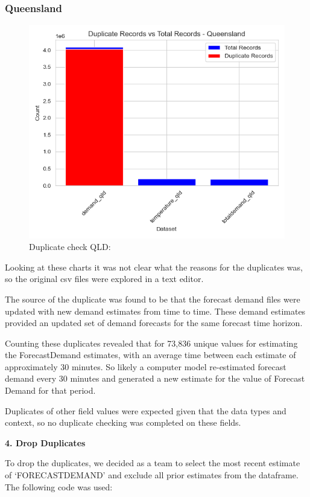 \documentclass[mstat,12pt]{unswthesis}
\begin{document}
\subsubsection{Queensland}\label{queensland}

\begin{figure}
\centering
\includegraphics{img/duplicate_check_QLD.png}
\caption{Duplicate check QLD:}
\end{figure}

Looking at these charts it was not clear what the reasons for the
duplicates was, so the original csv files were explored in a text
editor.

The source of the duplicate was found to be that the forecast demand
files were updated with new demand estimates from time to time. These
demand estimates provided an updated set of demand forecasts for the
same forecast time horizon.

Counting these duplicates revealed that for 73,836 unique values for
estimating the ForecastDemand estimates, with an average time between
each estimate of approximately 30 minutes. So likely a computer model
re-estimated forecast demand every 30 minutes and generated a new
estimate for the value of Forecast Demand for that period.

Duplicates of other field values were expected given that the data types
and context, so no duplicate checking was completed on these fields.

\textbf{4. Drop Duplicates}

To drop the duplicates, we decided as a team to select the most recent
estimate of `FORECASTDEMAND' and exclude all prior estimates from the
dataframe. The following code was used:
\end{document}
